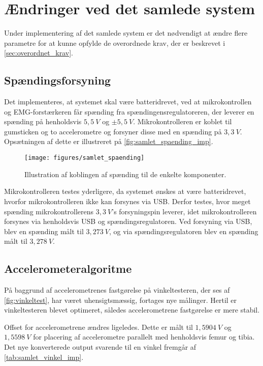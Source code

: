\section{Ændringer ved det samlede system} \label{sec:samlet_system}
Under implementering af det samlede system er det nødvendigt at ændre flere parametre for at kunne opfylde de overordnede krav, der er beskrevet i \autoref{sec:overordnet_krav}. 

\subsection{Spændingsforsyning}
Det implementeres, at systemet skal være batteridrevet, ved at mikrokontrollen og EMG-forstærkeren får spænding fra spændingensregulatoreren, der leverer en spænding på henholdsvis $5,5~V$ og $\pm 5,5~V$. 
Mikrokontrolleren er koblet til gumsticken og to accelerometre og forsyner disse med en spænding på $3,3~V$. 
Opsætningen af dette er illustreret på \autoref{fig:samlet_spaending_imp}. 

\begin{figure}[H]
\centering
\texttt{[image: figures/samlet\_spaending]}
\caption{Illustration af koblingen af spænding til de enkelte komponenter.}
\label{fig:samlet_spaending_imp}
\end{figure}

\noindent
Mikrokontrolleren testes yderligere, da systemet ønskes at være batteridrevet, hvorfor mikrokontrolleren ikke kan forsynes via USB. 
Derfor testes, hvor meget spænding mikrokontrollerens $3,3~V$'s forsyningspin leverer, idet mikrokontrolleren forsynes via henholdsvis USB og spændingsregulatoren. 
Ved forsyning via USB, blev en spænding målt til $3,273~V$, og via spændingsregulatoren blev en spænding målt til $3,278~V$.

\subsection{Accelerometeralgoritme}
På baggrund af accelerometrenes fastgørelse på vinkeltesteren, der ses af \autoref{fig:vinkeltest}, har været uhensigtsmæssig, fortages nye målinger. 
Hertil er vinkeltesteren blevet optimeret, således accelerometrene fastgørelse er mere stabil.
  
Offset for accelerometrene ændres ligeledes. Dette er målt til $1,5904~V$ og $1,5598~V$ for placering af accelerometre parallelt med henholdsvis femur og tibia. 
Det nye konverterede output svarende til en vinkel fremgår af \autoref{tab:samlet_vinkel_imp}. 

